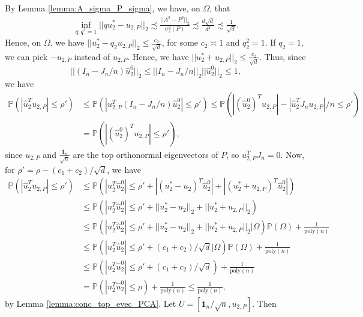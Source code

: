 \documentclass{article}
\begin{document}
By Lemma \ref{lemma:A_sigma_P_sigma}, we have, on $\Omega$, that
\begin{align*}
\mathop{\inf}_{q: q^2 = 1}||qu_2^* - u_{2, P}||_2 \precsim \frac{||A^2 - P^2||_2}{\sigma_2^2(P)} \precsim \frac{d\sqrt{d}}{d^2} \precsim \frac{1}{\sqrt{d}}.
\end{align*}
Hence, on $\Omega$, we have $||u_2^* - q_2u_{2, P}||_2 \leq \frac{c_2}{\sqrt{d}}$, for some $c_2 \asymp 1$ and $q_2^2 = 1$. If $q_2 = 1$, we can pick $-u_{2, P}$ instead of $u_{2, P}$. Hence, we have $||u_2^* +u_{2, P}||_2 \leq \frac{c_2}{\sqrt{d}}$. Thus, since
\begin{equation*}
||(I_n - J_n/n)\hat{u}_2^0||_2 \leq ||I_n - J_n/n||_2||\hat{u}_2^0||_2 \leq 1,
\end{equation*}
we have 
\begin{align*}
\mathbb{P}\left(|\hat{u}_2^Tu_{2, P}| \leq \rho'\right) & \leq \mathbb{P}\left(|u_{2, P}^T(I_n - J_n/n)\hat{u}_2^0| \leq \rho'\right) \leq \mathbb{P}\left(|(\hat{u}_2^0)^Tu_{2, P}| - |\hat{u}_2^TJ_nu_{2, P}|/n \leq \rho'\right) \\
%
& = \mathbb{P}(|(\hat{u}_2^0)^Tu_{2, P}| \leq \rho'),
\end{align*}
since $u_{2, P}$ and $\frac{\mathbf{1}_n}{\sqrt{n}}$ are the top orthonormal eigenvectors of $P$, so $u_{2, P}^TJ_n = 0$. Now, for $\rho' = \rho - (c_1 + c_2)/\sqrt{d}$, we have
\begin{align*}
\mathbb{P}\left(|\hat{u}_2^Tu_{2, P}| \leq  \rho'\right) & \leq \mathbb{P}\left(|u_2^T\hat{u}_2^0| \leq \rho' + |(u_2^* - u_2)^T\hat{u}_2^0| + |(u_2^* + u_{2, P})^T\hat{u}_2^0|\right)\\
&\leq \mathbb{P}\left(|u_2^T\hat{u}_2^0| \leq \rho' + ||u_2^* - u_2||_2 + ||u_2^* + u_{2, P}||_2\right)\\
&\leq \mathbb{P}\left(|u_2^T\hat{u}_2^0| \leq \rho' + ||u_2^* - u_2||_2 + ||u_2^* + u_{2, P}||_2|\Omega\right)\mathbb{P}(\Omega) + \frac{1}{\mathrm{poly}(n)}\\
&\leq \mathbb{P}\left(|u_2^T\hat{u}_2^0| \leq \rho' +(c_1 + c_2)/\sqrt{d}|\Omega\right)\mathbb{P}(\Omega) + \frac{1}{\mathrm{poly}(n)}\\
&\leq \mathbb{P}\left(|u_2^T\hat{u}_2^0| \leq \rho' +(c_1 + c_2)/\sqrt{d}\right) + \frac{1}{\mathrm{poly}(n)}\\
&= \mathbb{P}\left(|u_2^T\hat{u}_2^0| \leq \rho\right) + \frac{1}{\mathrm{poly}(n)} \leq \frac{1}{\mathrm{poly}(n)},
\end{align*}
by Lemma \ref{lemma:conc_top_evec_PCA}. Let $U = \left[\mathbf{1}_n/\sqrt{n}, u_{2, P}\right]$. Then 
\end{document}
